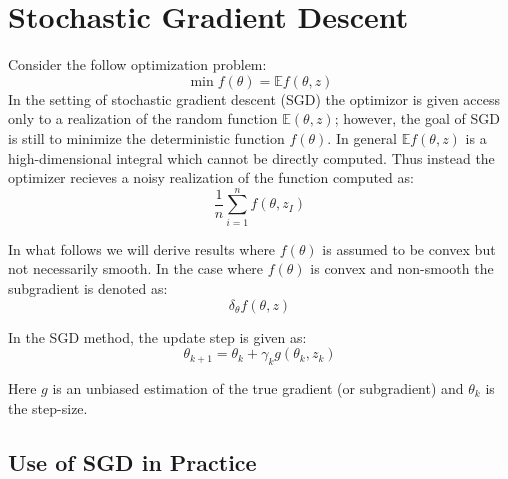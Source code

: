 \section{Stochastic Gradient Descent}
Consider the follow optimization problem:
\begin{equation}
	\min f(\theta) = \mathbb{E}f(\theta, z)
\end{equation}
In the setting of stochastic gradient descent (SGD) the optimizor is given access only to a realization of the random function $\mathbb{E} (\theta, z)$; however, the goal of SGD is still to minimize the deterministic function $f(\theta)$. 
In general $\mathbb{E}f(\theta, z)$ is a high-dimensional integral which cannot be directly computed. Thus instead the optimizer recieves a noisy realization of the function computed as:
\begin{equation}
	\frac{1}{n}\sum_{i=1}^{n} f(\theta, z_I)
\end{equation}

In what follows we will derive results where $f(\theta)$ is assumed to be convex but not necessarily smooth. In the case where $f(\theta)$ is convex and non-smooth the subgradient is denoted as: 
\begin{equation}
\delta_{\theta} f (\theta,z)
\end{equation}


In the SGD method, the update step is given as: 
\begin{equation}
	\theta_{k+1} = \theta_k + \gamma_k g\left(\theta_k, z_k\right)
\end{equation}

Here $g$ is an unbiased estimation of the true gradient (or subgradient) and $\theta_k$ is the step-size. 

\subsection{Use of SGD in Practice}
